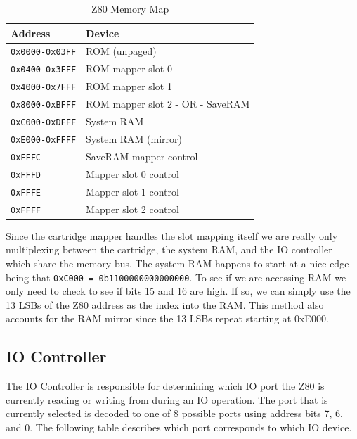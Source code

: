 \documentclass{article}
\begin{document}
\begin{table}[H]
    \centering
    \begin{tabular}{ll}
        \toprule
        \textbf{Address} & \textbf{Device} \\
        \midrule
        \texttt{0x0000-0x03FF} & ROM (unpaged)                    \\
        \texttt{0x0400-0x3FFF} & ROM mapper slot 0                \\
        \texttt{0x4000-0x7FFF} & ROM mapper slot 1                \\
        \texttt{0x8000-0xBFFF} & ROM mapper slot 2 - OR - SaveRAM \\
        \texttt{0xC000-0xDFFF} & System RAM                       \\
        \texttt{0xE000-0xFFFF} & System RAM (mirror)              \\
        \texttt{0xFFFC}       & SaveRAM mapper control           \\
        \texttt{0xFFFD}       & Mapper slot 0 control            \\
        \texttt{0xFFFE}       & Mapper slot 1 control            \\
        \texttt{0xFFFF}       & Mapper slot 2 control            \\
        \bottomrule
    \end{tabular}
    \fontfamily{}\selectfont
    \caption{Z80 Memory Map \protect\cite{mem_map_table}}
\end{table}

Since the cartridge mapper handles the slot mapping itself we are really
only multiplexing between the cartridge, the system RAM, and the IO controller
which share the memory bus.  The system RAM happens to start at a nice edge
being that \texttt{0xC000 = 0b1100000000000000}. To see if we are accessing RAM
we only need to check to see if bits 15 and 16 are high. If so, we can simply
use the 13 LSBs of the Z80 address as the index into the RAM.  This method also
accounts for the RAM mirror since the 13 LSBs repeat starting at 0xE000.

\subsection{IO Controller}

The IO Controller is responsible for determining which IO port
the Z80 is currently reading or writing from during an IO operation.
The port that is currently selected is decoded to one of 8 possible
ports using address bits 7, 6, and 0. The following table describes
which port corresponds to which IO device.
\end{document}
